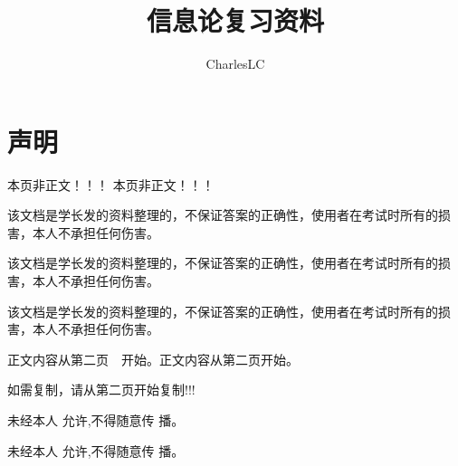 \documentclass[normal,cyan]{elegantnote}
\title{信息论复习资料\footnotemark[1]}
\author{CharlesLC\footnotemark[2]}
\institute{建模小组成员}
\date{\zhtoday}
\begin{document}
\maketitle
\section*{\centering {}声明}
\hspace*{1cm} {\heiti{}本页非正文！！！}   {\heiti{}本页非正文！！！} \par
{\heiti{}该文档是学长发的资料整理的，不保证答案的}{\heiti{}正确性}，{\heiti{}使用者在考试时所有的损害}，{\heiti{}本人不承担任何伤害。}\par
{\heiti{}该文档是学长发的资料整理的，不保证答案的}{\heiti{}正确性}，{\heiti{}使用者在考试时所有的损害}，{\heiti{}本人不承担任何伤害。}\par 
{\heiti{}该文档是学长发的资料整理的，不保证答案的}{\heiti{}正确性}，{\heiti{}使用者在考试时所有的损害}，{\heiti{}本人不承担任何伤害。}\par 
{\heiti{}正文内容从}{\heiti{}第二页}\ \ {\heiti{}开始。}{\heiti{}正文内容从}{\heiti{}第二页}{\heiti{}开始。}\par
{\heiti{}如需复制，请从第二页开始复制!!!}\par
\vspace*{1cm}
{\heiti{}未}{\heiti{}经}{\heiti{}本}{\heiti{}人}
{\heiti{}允}{\heiti{}许,}{\heiti{}不}{\heiti{}得}{\heiti{}随}{\heiti{}意}{\heiti{}传}
{\heiti{}播。}\par
{\heiti{}未}{\heiti{}经}{\heiti{}本}{\heiti{}人}
{\heiti{}允}{\heiti{}许,}{\heiti{}不}{\heiti{}得}{\heiti{}随}{\heiti{}意}{\heiti{}传}
{\heiti{}播。}

\renewcommand{\headrulewidth}{0.4pt}
\renewcommand{\footrulewidth}{0.4pt}
\thispagestyle{empty}
\newpage
\section*{\centering  {}}
\end{document}
